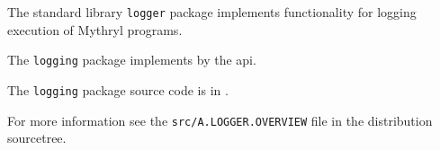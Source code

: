
The standard library {\tt logger} package implements functionality for logging execution of Mythryl programs.

The {\tt logging} package implements by the  api.

The {\tt logging} package source code is in . 

For more information see the {\tt src/A.LOGGER.OVERVIEW} file in the distribution sourcetree. 

